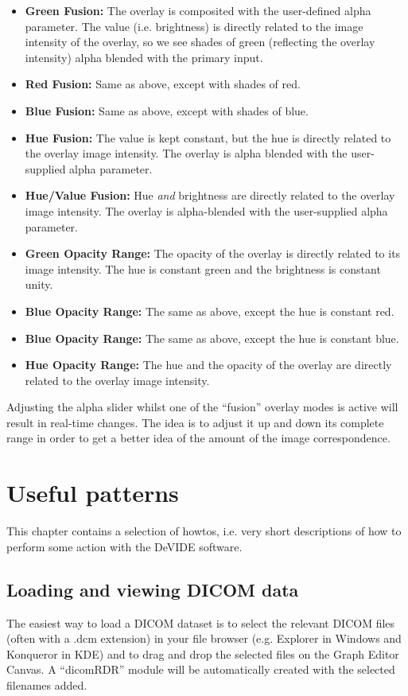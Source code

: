\begin{itemize}
\item {\bf Green Fusion:} The overlay is composited with the
  user-defined alpha parameter.  The value (i.e. brightness) is
  directly related to the image intensity of the overlay, so we see
  shades of green (reflecting the overlay intensity) alpha blended with
  the primary input.
\item {\bf Red Fusion:} Same as above, except with shades of red.
\item {\bf Blue Fusion:} Same as above, except with shades of blue.
\item {\bf Hue Fusion:} The value is kept constant, but the hue is
  directly related to the overlay image intensity.  The overlay is
  alpha blended with the user-supplied alpha parameter.
\item {\bf Hue/Value Fusion:} Hue {\em and} brightness are directly
  related to the overlay image intensity.  The overlay is
  alpha-blended with the user-supplied alpha parameter.
\item {\bf Green Opacity Range:} The opacity of the overlay is
  directly related to its image intensity.  The hue is constant green
  and the brightness is constant unity.
\item {\bf Blue Opacity Range:} The same as above, except the hue is
  constant red.
\item {\bf Blue Opacity Range:} The same as above, except the hue is
  constant blue.
\item {\bf Hue Opacity Range:} The hue and the opacity of the overlay
  are directly related to the overlay image intensity.
\end{itemize}

Adjusting the alpha slider whilst one of the ``fusion'' overlay modes
is active will result in real-time changes.  The idea is to adjust it
up and down its complete range in order to get a better idea of the
amount of the image correspondence.

\chapter{Useful patterns}\label{sec_useful_patterns}
This chapter contains a selection of howtos, i.e. very short
descriptions of how to perform some action with the DeVIDE software.

\section{Loading and viewing DICOM data}
The easiest way to load a DICOM dataset is to select the relevant
DICOM files (often with a .dcm extension) in your file browser
(e.g. Explorer in Windows and Konqueror in KDE) and to drag and drop
the selected files on the Graph Editor Canvas.  A ``dicomRDR'' module
will be automatically created with the selected filenames added.

